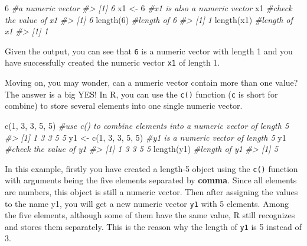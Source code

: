 \documentclass[
]{book}
\newenvironment{Shaded}{\begin{snugshade}}{\end{snugshade}}
\newcommand{\CommentTok}[1]{\textcolor[rgb]{0.56,0.35,0.01}{\textit{#1}}}
\newcommand{\DecValTok}[1]{\textcolor[rgb]{0.00,0.00,0.81}{#1}}
\newcommand{\FunctionTok}[1]{\textcolor[rgb]{0.00,0.00,0.00}{#1}}
\newcommand{\NormalTok}[1]{#1}
\newcommand{\OtherTok}[1]{\textcolor[rgb]{0.56,0.35,0.01}{#1}}
\begin{document}
\begin{Shaded}
\begin{Highlighting}[]
\DecValTok{6}                         \CommentTok{\#a numeric vector}
\CommentTok{\#\textgreater{} [1] 6}
\NormalTok{x1 }\OtherTok{\textless{}{-}} \DecValTok{6}                   \CommentTok{\#x1 is also a numeric vector}
\NormalTok{x1                        }\CommentTok{\#check the value of x1}
\CommentTok{\#\textgreater{} [1] 6}
\FunctionTok{length}\NormalTok{(}\DecValTok{6}\NormalTok{)                 }\CommentTok{\#length of 6}
\CommentTok{\#\textgreater{} [1] 1}
\FunctionTok{length}\NormalTok{(x1)                }\CommentTok{\#length of x1}
\CommentTok{\#\textgreater{} [1] 1}
\end{Highlighting}
\end{Shaded}

Given the output, you can see that \texttt{6} is a numeric vector with length 1 and you have successfully created the numeric vector \texttt{x1} of length 1.

Moving on, you may wonder, can a numeric vector contain more than one value? The answer is a big YES! In R, you can use the \texttt{c()} function (\texttt{c} is short for combine) to store several elements into one single numeric vector.

\begin{Shaded}
\begin{Highlighting}[]
\FunctionTok{c}\NormalTok{(}\DecValTok{1}\NormalTok{, }\DecValTok{3}\NormalTok{, }\DecValTok{3}\NormalTok{, }\DecValTok{5}\NormalTok{, }\DecValTok{5}\NormalTok{)          }\CommentTok{\#use c() to combine elements into a numeric vector of length 5}
\CommentTok{\#\textgreater{} [1] 1 3 3 5 5}
\NormalTok{y1 }\OtherTok{\textless{}{-}} \FunctionTok{c}\NormalTok{(}\DecValTok{1}\NormalTok{, }\DecValTok{3}\NormalTok{, }\DecValTok{3}\NormalTok{, }\DecValTok{5}\NormalTok{, }\DecValTok{5}\NormalTok{)    }\CommentTok{\#y1 is a numeric vector of length 5}
\NormalTok{y1                        }\CommentTok{\#check the value of y1}
\CommentTok{\#\textgreater{} [1] 1 3 3 5 5}
\FunctionTok{length}\NormalTok{(y1)                }\CommentTok{\#length of y1}
\CommentTok{\#\textgreater{} [1] 5}
\end{Highlighting}
\end{Shaded}

In this example, firstly you have created a length-5 object using the \texttt{c()} function with arguments being the five elements separated by \textbf{comma}. Since all elements are numbers, this object is still a numeric vector. Then after assigning the values to the name y1, you will get a new numeric vector \texttt{y1} with 5 elements. Among the five elements, although some of them have the same value, R still recognizes and stores them separately. This is the reason why the length of \texttt{y1} is 5 instead of 3.
\end{document}

